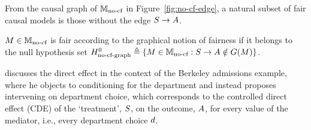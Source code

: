 From the causal graph of $\mathbb{M}_{\text{no-cf}}$ in Figure~\ref{fig:no-cf-edge}, a natural subset of fair causal models is those without the edge $S \rightarrow A$. 

\begin{definition}\label{def:graph_fairness}
     $M \in \mathbb{M}_{\text{no-cf}}$ is fair according to the graphical notion of fairness if it belongs to the null hypothesis set $H^0_{\text{no-cf-graph}} \triangleq \left \lbrace M \in \mathbb{M}_{\text{no-cf}} : S \rightarrow A \notin G{\left({M}\right)} \right \rbrace$.
\end{definition}


\citet[Section 4.5.3]{Pearl09} discusses the direct effect in the context of the Berkeley admissions example, where he objects to conditioning for the department and instead proposes intervening on department choice, which corresponds to the controlled direct effect (CDE) \citep{Pearl01} of the `treatment', $S$, on the outcome, $A$, for every value of the mediator, i.e., every department choice $d$. 

